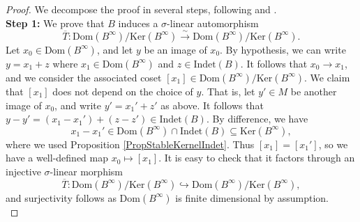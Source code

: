 \documentclass[12pt]{amsart}
\theoremstyle{definition}
\newcommand{\<}{\langle}   %
\renewcommand{\>}{\rangle} %
\begin{document}
\begin{proof}
We decompose the proof in several steps, following \cite{kraft:1975} and \cite{chai:kraft2025}.\\

\textbf{Step 1:} We prove that $B$ induces a $\sigma$-linear automorphism 
\begin{equation*}
    \overline{T}:\mathrm{Dom}(B^{\infty})/\mathrm{Ker}(B^{\infty}) \xrightarrow{\sim} \mathrm{Dom}(B^{\infty})/\mathrm{Ker}(B^{\infty}).
\end{equation*}
Let $x_0 \in \mathrm{Dom}(B^{\infty})$, and let $y$ be an image of $x_0$. By hypothesis, we can write $y=x_1+z$ where $x_1 \in \mathrm{Dom}(B^{\infty})$ and $z\in \mathrm{Indet}(B)$. It follows that $x_0\to x_1$, and we consider the associated coset $[x_1] \in \mathrm{Dom}(B^{\infty})/\mathrm{Ker}(B^{\infty})$. We claim that $[x_1]$ does not depend on the choice of $y$. That is, let $y' \in M$ be another image of $x_0$, and write $y' = x_1' + z'$ as above. It follows that $y-y' = (x_1-x_1') + (z-z') \in \mathrm{Indet}(B)$. By difference, we have 
\begin{equation*}
    x_1-x_1' \in \mathrm{Dom}(B^{\infty})\cap \mathrm{Indet}(B) \subseteq  \mathrm{Ker}(B^{\infty}),
\end{equation*}
where we used Proposition \ref{PropStableKernelIndet}. Thus $[x_1] = [x_1']$, so we have a well-defined map $x_0 \mapsto [x_1]$. It is easy to check that it factors through an injective $\sigma$-linear morphism
\begin{equation*}
    \overline{T}:\mathrm{Dom}(B^{\infty})/\mathrm{Ker}(B^{\infty}) \hookrightarrow \mathrm{Dom}(B^{\infty})/\mathrm{Ker}(B^{\infty}),
\end{equation*}
and surjectivity follows as $\mathrm{Dom}(B^{\infty})$ is finite dimensional by assumption.\\


\end{proof}
\end{document}

